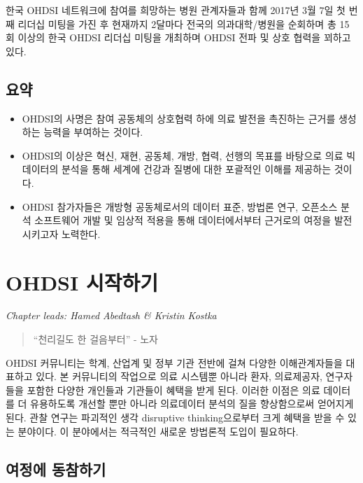 \documentclass[10.5pt]{book}
\theoremstyle{definition}
\theoremstyle{definition}
\theoremstyle{definition}
\theoremstyle{remark}
\let\BeginKnitrBlock\begin \let\EndKnitrBlock\end
\begin{document}
한국 OHDSI 네트워크에 참여를 희망하는 병원 관계자들과 함께 2017년 3월
7일 첫 번째 리더십 미팅을 가진 후 현재까지 2달마다 전국의
의과대학/병원을 순회하며 총 15회 이상의 한국 OHDSI 리더십 미팅을
개최하며 OHDSI 전파 및 상호 협력을 꾀하고 있다.

\section{요약}

\BeginKnitrBlock{rmdsummary}
\begin{itemize}
\item
  OHDSI의 사명은 참여 공동체의 상호협력 하에 의료 발전을 촉진하는 근거를
  생성하는 능력을 부여하는 것이다.
\item
  OHDSI의 이상은 혁신, 재현, 공동체, 개방, 협력, 선행의 목표를 바탕으로
  의료 빅데이터의 분석을 통해 세계에 건강과 질병에 대한 포괄적인 이해를
  제공하는 것이다.
\item
  OHDSI 참가자들은 개방형 공동체로서의 데이터 표준, 방법론 연구,
  오픈소스 분석 소프트웨어 개발 및 임상적 적용을 통해 데이터에서부터
  근거로의 여정을 발전시키고자 노력한다.
\end{itemize}
\EndKnitrBlock{rmdsummary}

\chapter{OHDSI 시작하기}\label{WhereToBegin}

\emph{Chapter leads: Hamed Abedtash \& Kristin Kostka}

\begin{quote}
``천리길도 한 걸음부터'' - 노자
\end{quote}

OHDSI 커뮤니티는 학계, 산업계 및 정부 기관 전반에 걸쳐 다양한
이해관계자들을 대표하고 있다. 본 커뮤니티의 작업으로 의료 시스템뿐
아니라 환자, 의료제공자, 연구자들을 포함한 다양한 개인들과 기관들이
혜택을 받게 된다. 이러한 이점은 의료 데이터를 더 유용하도록 개선할 뿐만
아니라 의료데이터 분석의 질을 향상함으로써 얻어지게 된다. 관찰 연구는
파괴적인 생각 disruptive thinking으로부터 크게 혜택을 받을 수 있는
분야이다. 이 분야에서는 적극적인 새로운 방법론적 도입이 필요하다.

\section{여정에 동참하기}\label{-}
\end{document}
